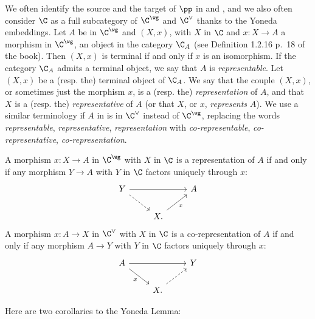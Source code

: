 \documentclass[12pt]{article}
\theoremstyle{remark}
\theoremstyle{definition}
\begin{document}
\begin{conv}
We often identify the source and the target of $\pp$ in  and , and we also often consider $\C$ as a full subcategory of $\C^\wg$ and $\C^\vee$ thanks to the Yoneda embeddings. Let $A$ be in $\C^\wg$ and $(X,x)$, with $X$ in $\C$ and $x:X\to A$ a morphism in $\C^\wg$, an object in the category $\C_A$ (see Definition 1.2.16 p.~18 of the book). Then %
$(X,x)$ is terminal if and only if $x$ is an isomorphism. If the category $\C_A$ admits a terminal object, we say that $A$ is \emph{representable}. Let $(X,x)$ be a (resp. the) terminal object of $\C_A$. We say that the couple $(X,x)$, or sometimes just the morphism $x$, is a (resp. the) \emph{representation} of $A$, and that $X$ is a (resp. the) \emph{representative} of $A$ (or that $X$, or $x$, \emph{represents} $A$). We use a similar terminology if $A$ in is in $\C^\vee$ instead of $\C^\wg$, replacing the words \emph{representable}, \emph{representative}, \emph{representation} with \emph{co-representable}, \emph{co-representative}, \emph{co-representation}. 
\end{conv}

A morphism $x:X\to A$ in $\C^\wg$ with $X$ in $\C$ is a representation of $A$ if and only if any morphism $Y\to A$ with $Y$ in $\C$ factors uniquely through $x$:
$$
\begin{tikzcd}
Y\ar[rr]\ar[dr,dashed]&&A\\ 
&X.\ar[ru,"x"']
\end{tikzcd}
$$ 
A morphism $x:A\to X$ in $\C^\vee$ with $X$ in $\C$ is a co-representation of $A$ if and only if any morphism $A\to Y$ with $Y$ in $\C$ factors uniquely through $x$:
$$
\begin{tikzcd}
A\ar[rr]\ar[dr,"x"']&&Y\\ 
&X.\ar[ru,dashed]
\end{tikzcd}
$$

Here are two corollaries to the Yoneda Lemma:
\end{document}
